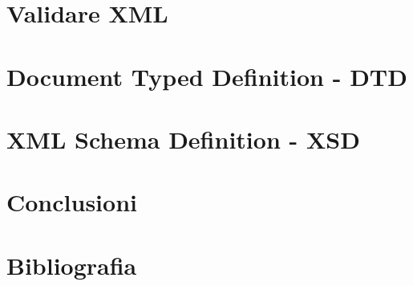 \documentclass{beamer}
\begin{document}
\section{Validare XML }
%

\section{Document Typed Definition - DTD}
%

%

\section{XML Schema Definition - XSD}
%
%

\section{Conclusioni}
%

\section*{Bibliografia}
%
\end{document}
